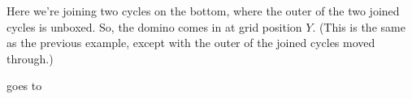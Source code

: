 \documentclass[12pt]{article}
\numberwithin{equation}{section}
\newcommand{\horizontalDominoRSShift}[4]{\filldraw [dominoRSStyle] (#2 - 1 + #4 + \eps, #1 - 1 + \eps) rectangle + (2 - \teps, 1 -\teps) node [dominoText] {$#3$};}
\begin{document}
  Here we're joining two cycles on the bottom, where the outer of the two joined cycles is unboxed.
  So, the domino comes in at grid position $Y$.
  (This is the same as the previous example, except with the outer of the joined cycles moved through.)
  \begin{figure}[H]
    \centering
  \end{figure}
  goes to
\end{document}
